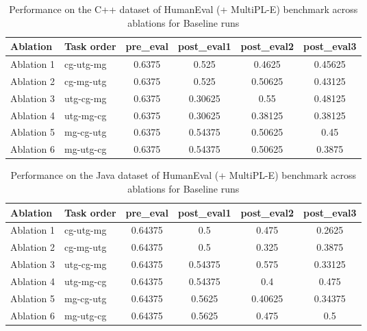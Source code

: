 \begin{table}[!ht]
    \centering
    \caption{Performance on the C++ dataset of HumanEval (+ MultiPL-E) benchmark across ablations for Baseline runs}
    \begin{tabular}{|l|l|S[table-format=2.4]|S[table-format=2.4]|S[table-format=2.4]|S[table-format=2.4]|}
    \hline
        \textbf{Ablation} & \textbf{Task order} & \textbf{pre\_eval} & \textbf{post\_eval1} & \textbf{post\_eval2} & \textbf{post\_eval3 } \\ \hline
        Ablation 1 & cg-utg-mg & 0.6375 & 0.525 & 0.4625 & 0.45625  \\ 
        Ablation 2 & cg-mg-utg & 0.6375 & 0.525 & 0.50625 & 0.43125  \\ 
        Ablation 3 & utg-cg-mg & 0.6375 & 0.30625 & 0.55 & 0.48125  \\ 
        Ablation 4 & utg-mg-cg & 0.6375 & 0.30625 & 0.38125 & 0.38125  \\ 
        Ablation 5 & mg-cg-utg & 0.6375 & 0.54375 & 0.50625 & 0.45  \\ 
        Ablation 6 & mg-utg-cg & 0.6375 & 0.54375 & 0.50625 & 0.3875 \\ \hline
    \end{tabular}
    \label{tab:CppBaseline}
\end{table}

\begin{table}[!ht]
    \centering
    \caption{Performance on the Java dataset of HumanEval (+ MultiPL-E) benchmark across ablations for Baseline runs}
    \begin{tabular}{|l|l|S[table-format=2.4]|S[table-format=2.4]|S[table-format=2.4]|S[table-format=2.4]|}
    \hline
        \textbf{Ablation} & \textbf{Task order} & \textbf{pre\_eval} & \textbf{post\_eval1} & \textbf{post\_eval2} & \textbf{post\_eval3 } \\ \hline
        Ablation 1 & cg-utg-mg & 0.64375 & 0.5 & 0.475 & 0.2625  \\ 
        Ablation 2 & cg-mg-utg & 0.64375 & 0.5 & 0.325 & 0.3875  \\ 
        Ablation 3 & utg-cg-mg & 0.64375 & 0.54375 & 0.575 & 0.33125  \\ 
        Ablation 4 & utg-mg-cg & 0.64375 & 0.54375 & 0.4 & 0.475  \\ 
        Ablation 5 & mg-cg-utg & 0.64375 & 0.5625 & 0.40625 & 0.34375  \\ 
        Ablation 6 & mg-utg-cg & 0.64375 & 0.5625 & 0.475 & 0.5 \\ \hline
    \end{tabular}
    \label{tab:JavaBaseline}
\end{table}

